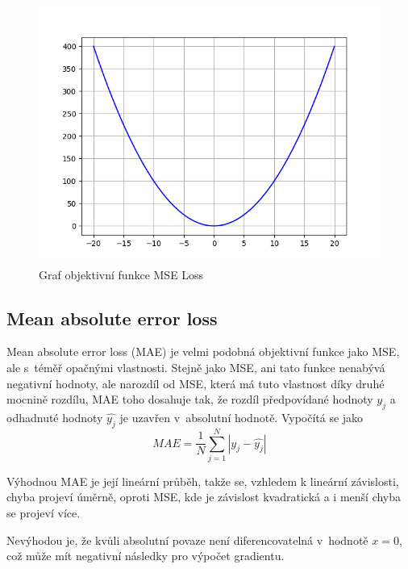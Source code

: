 \begin{figure}[H]
    \centering
    \includegraphics[scale=0.4]{obrazky-figures/mseloss.png}
    \caption{\label{fig:mseloss}Graf objektivní funkce MSE Loss}
\end{figure}


\subsection*{Mean absolute error loss}
Mean absolute error loss (MAE) je velmi podobná objektivní funkce jako MSE, ale s~téměř opačnými vlastnosti. Stejně jako MSE, ani tato funkce nenabývá negativní hodnoty, ale narozdíl od MSE, která má tuto vlastnost díky druhé mocnině rozdílu, MAE toho dosahuje tak, že rozdíl předpovídané hodnoty $y_j$ a odhadnuté hodnoty $\hat{y_j}$ je uzavřen v~absolutní hodnotě. Vypočítá se jako
\begin{equation}
  MAE = \frac{1}{N}\sum_{j=1}^N|y_j - \hat{y_j}|
\end{equation}

Výhodnou MAE je její lineární průběh, takže se, vzhledem k lineární závislosti, chyba projeví úměrně, oproti MSE, kde je závislost kvadratická a i menší chyba se projeví více.

Nevýhodou je, že kvůli absolutní povaze není diferencovatelná v~hodnotě $x=0$, což může mít negativní následky pro výpočet gradientu.

